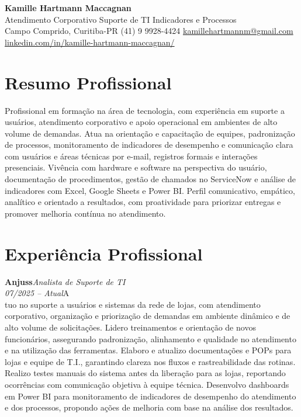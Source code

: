 \documentclass[11pt,a4paper]{article}
\newcommand{\cvrole}[4]{%
  \vspace{4pt}%
  {\bfseries\color{accentcolor}#1}\hfill{\itshape #2}\\[-2pt]%
  {\itshape #3}\hfill #4\\[6pt]%
}
\begin{document}
\begin{center}
  {\fontsize{20}{24}\selectfont\bfseries Kamille Hartmann Maccagnan}\\[8pt]
  {\large Atendimento Corporativo \textbar{} Suporte de TI \textbar{} Indicadores e Processos}\\[10pt]
  Campo Comprido, Curitiba-PR \enspace\textbullet\enspace (41) 9 9928-4424 \enspace\textbullet\enspace
  \href{mailto:kamillehartmannm@gmail.com}{kamillehartmannm@gmail.com}\\[3pt]
  \href{https://linkedin.com/in/kamille-hartmann-maccagnan/}{linkedin.com/in/kamille-hartmann-maccagnan/}
\end{center}

\vspace{6pt}

\section{Resumo Profissional}

Profissional em formação na área de tecnologia, com experiência em suporte a usuários, atendimento corporativo e apoio operacional em ambientes de alto volume de demandas. Atua na orientação e capacitação de equipes, padronização de processos, monitoramento de indicadores de desempenho e comunicação clara com usuários e áreas técnicas por e-mail, registros formais e interações presenciais. Vivência com hardware e software na perspectiva do usuário, documentação de procedimentos, gestão de chamados no ServiceNow e análise de indicadores com Excel, Google Sheets e Power BI. Perfil comunicativo, empático, analítico e orientado a resultados, com proatividade para priorizar entregas e promover melhoria contínua no atendimento.

\section{Experiência Profissional}

\cvrole{Anjuss}{Analista de Suporte de TI}{07/2025 -- Atual}

Atuo no suporte a usuários e sistemas da rede de lojas, com atendimento corporativo, organização e priorização de demandas em ambiente dinâmico e de alto volume de solicitações. Lidero treinamentos e orientação de novos funcionários, assegurando padronização, alinhamento e qualidade no atendimento e na utilização das ferramentas. Elaboro e atualizo documentações e POPs para lojas e equipe de T.I., garantindo clareza nos fluxos e rastreabilidade das rotinas. Realizo testes manuais do sistema antes da liberação para as lojas, reportando ocorrências com comunicação objetiva à equipe técnica. Desenvolvo dashboards em Power BI para monitoramento de indicadores de desempenho do atendimento e dos processos, propondo ações de melhoria com base na análise dos resultados.
\end{document}
